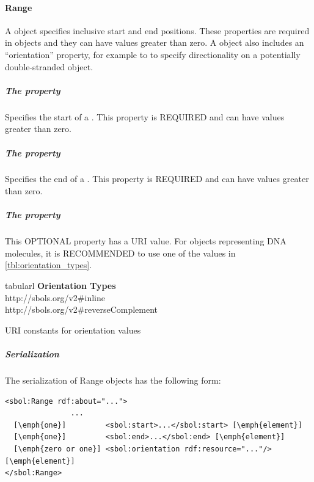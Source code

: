 \paragraph{Range}
\label{sec:Range}
A  object specifies inclusive start and end positions. These properties are required in  objects and they can have  values greater than zero. A  object also includes an  ``orientation'' property, for example to to specify directionality on a potentially double-stranded  object.

\subparagraph{The  property}
Specifies the start of a . This property is REQUIRED and can have  values greater than zero.

\subparagraph{The  property}
Specifies the end of a . This property is REQUIRED and can have  values greater than zero.


\subparagraph{The  property}
\label{sec:orientation}
This OPTIONAL property has a URI value. For  objects representing DNA molecules, it is RECOMMENDED to use one of the values in \ref{tbl:orientation_types}. 

\begin{table}[ht]
  \begin{edtable}{tabular}{l}
    \toprule
    \textbf{Orientation Types}  \\
    \midrule
    http://sbols.org/v2\#inline\\
    http://sbols.org/v2\#reverseComplement\\
    \bottomrule
  \end{edtable}
  \caption{URI constants for orientation values}
  \label{tbl:orientation_types}
\end{table}

\subparagraph{Serialization}

The serialization of Range objects has the following form:
\begin{lstlisting}
<sbol:Range rdf:about="...">
               ...   
  [\emph{one}]         <sbol:start>...</sbol:start> [\emph{element}] 
  [\emph{one}]         <sbol:end>...</sbol:end> [\emph{element}] 
  [\emph{zero or one}] <sbol:orientation rdf:resource="..."/> [\emph{element}] 
</sbol:Range>
\end{lstlisting}

